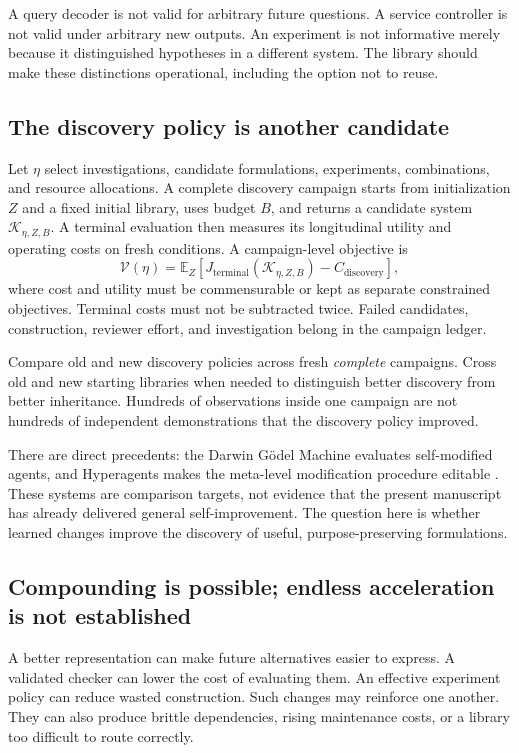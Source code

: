 \documentclass[11pt,letterpaper]{article}
\newcommand{\E}{\mathbb E}\newcommand{\Prob}{\mathbb P}
\newcommand{\K}{\mathcal K}\newcommand{\Cset}{\mathcal C}
\theoremstyle{remark}\newtheorem{remark}{Remark}[section]
\begin{document}
A query decoder is not valid for arbitrary future questions. A service controller is not valid under arbitrary new outputs. An experiment is not informative merely because it distinguished hypotheses in a different system. The library should make these distinctions operational, including the option not to reuse.

\subsection{The discovery policy is another candidate}
Let $\eta$ select investigations, candidate formulations, experiments, combinations, and resource allocations. A complete discovery campaign starts from initialization $Z$ and a fixed initial library, uses budget $B$, and returns a candidate system $\K_{\eta,Z,B}$. A terminal evaluation then measures its longitudinal utility and operating costs on fresh conditions. A campaign-level objective is
\begin{equation}
\mathcal V(\eta)=\E_Z\!\left[J_{\mathrm{terminal}}(\K_{\eta,Z,B})-C_{\mathrm{discovery}}\right],
\end{equation}
where cost and utility must be commensurable or kept as separate constrained objectives. Terminal costs must not be subtracted twice. Failed candidates, construction, reviewer effort, and investigation belong in the campaign ledger.

Compare old and new discovery policies across fresh \emph{complete} campaigns. Cross old and new starting libraries when needed to distinguish better discovery from better inheritance. Hundreds of observations inside one campaign are not hundreds of independent demonstrations that the discovery policy improved.

There are direct precedents: the Darwin G\"odel Machine evaluates self-modified agents, and Hyperagents makes the meta-level modification procedure editable \citep{zhang2025dgm,zhang2026hyper}. These systems are comparison targets, not evidence that the present manuscript has already delivered general self-improvement. The question here is whether learned changes improve the discovery of useful, purpose-preserving formulations.

\subsection{Compounding is possible; endless acceleration is not established}
A better representation can make future alternatives easier to express. A validated checker can lower the cost of evaluating them. An effective experiment policy can reduce wasted construction. Such changes may reinforce one another. They can also produce brittle dependencies, rising maintenance costs, or a library too difficult to route correctly.
\end{document}
